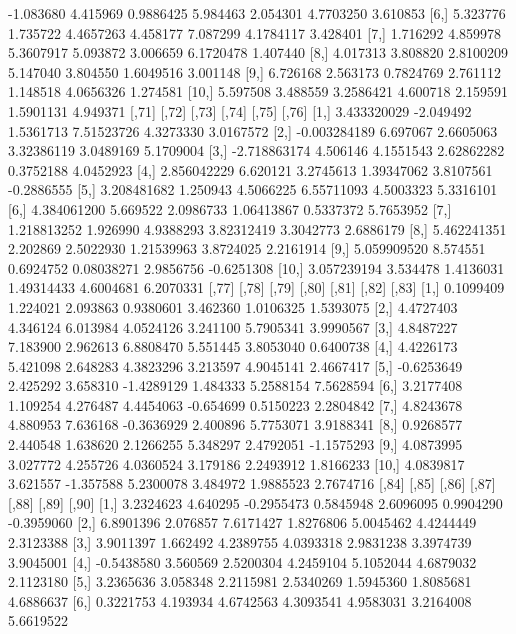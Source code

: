\documentclass[12pt]{article}
\begin{document}
\begin{Schunk}
\begin{Soutput}
 [5,] -1.083680 4.415969 0.9886425 5.984463 2.054301  4.7703250 3.610853
 [6,]  5.323776 1.735722 4.4657263 4.458177 7.087299  4.1784117 3.428401
 [7,]  1.716292 4.859978 5.3607917 5.093872 3.006659  6.1720478 1.407440
 [8,]  4.017313 3.808820 2.8100209 5.147040 3.804550  1.6049516 3.001148
 [9,]  6.726168 2.563173 0.7824769 2.761112 1.148518  4.0656326 1.274581
[10,]  5.597508 3.488559 3.2586421 4.600718 2.159591  1.5901131 4.949371
             [,71]     [,72]     [,73]      [,74]     [,75]      [,76]
 [1,]  3.433320029 -2.049492 1.5361713 7.51523726 4.3273330  3.0167572
 [2,] -0.003284189  6.697067 2.6605063 3.32386119 3.0489169  5.1709004
 [3,] -2.718863174  4.506146 4.1551543 2.62862282 0.3752188  4.0452923
 [4,]  2.856042229  6.620121 3.2745613 1.39347062 3.8107561 -0.2886555
 [5,]  3.208481682  1.250943 4.5066225 6.55711093 4.5003323  5.3316101
 [6,]  4.384061200  5.669522 2.0986733 1.06413867 0.5337372  5.7653952
 [7,]  1.218813252  1.926990 4.9388293 3.82312419 3.3042773  2.6886179
 [8,]  5.462241351  2.202869 2.5022930 1.21539963 3.8724025  2.2161914
 [9,]  5.059909520  8.574551 0.6924752 0.08038271 2.9856756 -0.6251308
[10,]  3.057239194  3.534478 1.4136031 1.49314433 4.6004681  6.2070331
           [,77]    [,78]     [,79]      [,80]     [,81]     [,82]      [,83]
 [1,]  0.1099409 1.224021  2.093863  0.9380601  3.462360 1.0106325  1.5393075
 [2,]  4.4727403 4.346124  6.013984  4.0524126  3.241100 5.7905341  3.9990567
 [3,]  4.8487227 7.183900  2.962613  6.8808470  5.551445 3.8053040  0.6400738
 [4,]  4.4226173 5.421098  2.648283  4.3823296  3.213597 4.9045141  2.4667417
 [5,] -0.6253649 2.425292  3.658310 -1.4289129  1.484333 5.2588154  7.5628594
 [6,]  3.2177408 1.109254  4.276487  4.4454063 -0.654699 0.5150223  2.2804842
 [7,]  4.8243678 4.880953  7.636168 -0.3636929  2.400896 5.7753071  3.9188341
 [8,]  0.9268577 2.440548  1.638620  2.1266255  5.348297 2.4792051 -1.1575293
 [9,]  4.0873995 3.027772  4.255726  4.0360524  3.179186 2.2493912  1.8166233
[10,]  4.0839817 3.621557 -1.357588  5.2300078  3.484972 1.9885523  2.7674716
           [,84]    [,85]      [,86]     [,87]      [,88]     [,89]      [,90]
 [1,]  3.2324623 4.640295 -0.2955473 0.5845948  2.6096095 0.9904290 -0.3959060
 [2,]  6.8901396 2.076857  7.6171427 1.8276806  5.0045462 4.4244449  2.3123388
 [3,]  3.9011397 1.662492  4.2389755 4.0393318  2.9831238 3.3974739  3.9045001
 [4,] -0.5438580 3.560569  2.5200304 4.2459104  5.1052044 4.6879032  2.1123180
 [5,]  3.2365636 3.058348  2.2115981 2.5340269  1.5945360 1.8085681  4.6886637
 [6,]  0.3221753 4.193934  4.6742563 4.3093541  4.9583031 3.2164008  5.6619522

\end{Soutput}
\end{Schunk}
\end{document}
